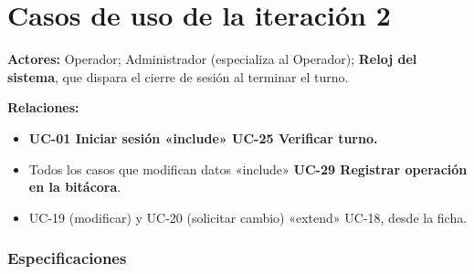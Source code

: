\section{Casos de uso de la iteración 2}



\textbf{Actores:} Operador; Administrador (especializa al Operador); \textbf{Reloj del sistema}, que dispara el cierre de sesión al terminar el turno.


\textbf{Relaciones:}

\begin{itemize}
  \item \textbf{UC-01 Iniciar sesión «include» UC-25 Verificar turno.}
  \item Todos los casos que modifican datos «include» \textbf{UC-29 Registrar operación en la bitácora}.
  \item UC-19 (modificar) y UC-20 (solicitar cambio) «extend» UC-18, desde la ficha.
\end{itemize}

\subsubsection{Especificaciones}

